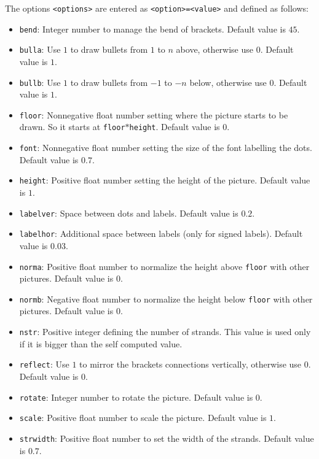 \documentclass[reqno]{../../../Projects/LaTeX/gtpart}
\numberwithin{equation}{section}
\begin{document}
The options \texttt{<options>} are entered as \texttt{<option>=<value>} and defined as follows:
\begin{itemize}
\item \texttt{bend}: Integer number to manage the bend of brackets. Default value is $45$.
\item \texttt{bulla}: Use $1$ to draw bullets from $1$ to $n$ above, otherwise use $0$. Default value is $1$.
\item \texttt{bullb}: Use $1$ to draw bullets from $-1$ to $-n$ below, otherwise use $0$. Default value is $1$.
\item \texttt{floor}: Nonnegative float number setting where the picture starts to be drawn. So it starts at \texttt{floor}$*$\texttt{height}. Default value is $0$.
\item \texttt{font}: Nonnegative float number setting the size of the font labelling the dots. Default value is $0.7$.
\item \texttt{height}: Positive float number setting the height of the picture. Default value is $1$. 
\item \texttt{labelver}: Space between dots and labels. Default value is $0.2$.
\item \texttt{labelhor}: Additional space between labels (only for signed labels). Default value is $0.03$.
\item \texttt{norma}: Positive float number to normalize the height above \texttt{floor} with other pictures. Default value is $0$.
\item \texttt{normb}: Negative float number to normalize the height below \texttt{floor} with other pictures. Default value is $0$.
\item \texttt{nstr}: Positive integer defining the number of strands. This value is used only if it is bigger than the self computed value.
\item \texttt{reflect}: Use $1$ to mirror the brackets connections vertically, otherwise use $0$. Default value is $0$.  
\item \texttt{rotate}: Integer number to rotate the picture. Default value is $0$.
\item \texttt{scale}: Positive float number to scale the picture. Default value is $1$.
\item \texttt{strwidth}: Positive float number to set the width of the strands. Default value is $0.7$.

\end{itemize}
\end{document}
